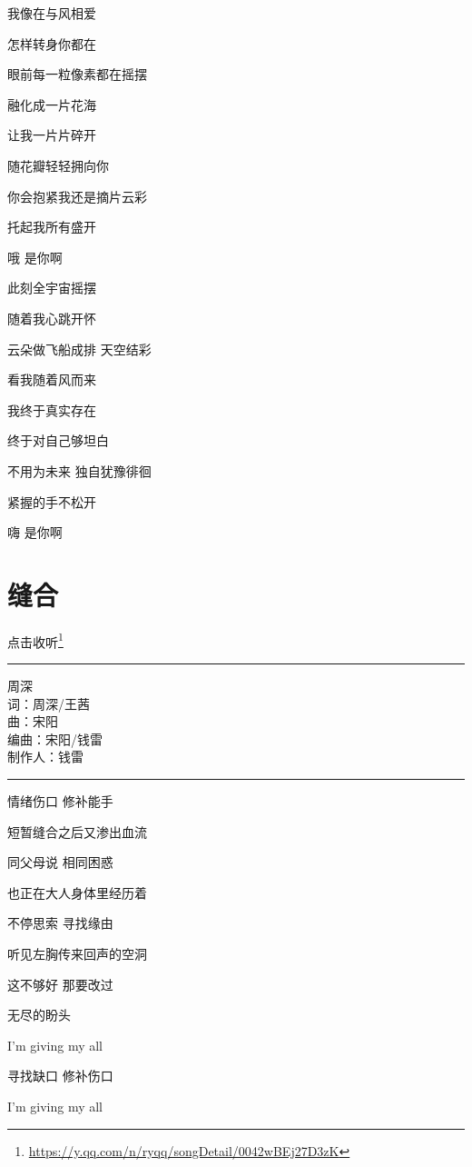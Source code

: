 \documentclass[]{ctexbook}
\renewcommand{\href}[2]{#2\footnote{\url{#1}}}
\begin{document}
我像在与风相爱

怎样转身你都在

眼前每一粒像素都在摇摆

融化成一片花海

让我一片片碎开

随花瓣轻轻拥向你

你会抱紧我还是摘片云彩

托起我所有盛开

哦 是你啊

此刻全宇宙摇摆

随着我心跳开怀

云朵做飞船成排 天空结彩

看我随着风而来

我终于真实存在

终于对自己够坦白

不用为未来 独自犹豫徘徊

紧握的手不松开

嗨 是你啊

\section*{缝合}\label{fix-you}


\href{https://y.qq.com/n/ryqq/songDetail/0042wBEj27D3zK}{点击收听}

\begin{center}\rule{0.5\linewidth}{0.5pt}\end{center}

周深\\
词：周深/王茜\\
曲：宋阳\\
编曲：宋阳/钱雷\\
制作人：钱雷

\begin{center}\rule{0.5\linewidth}{0.5pt}\end{center}

情绪伤口 修补能手

短暂缝合之后又渗出血流

同父母说 相同困惑

也正在大人身体里经历着

不停思索 寻找缘由

听见左胸传来回声的空洞

这不够好 那要改过

无尽的盼头

I'm giving my all

寻找缺口 修补伤口

I'm giving my all
\end{document}
